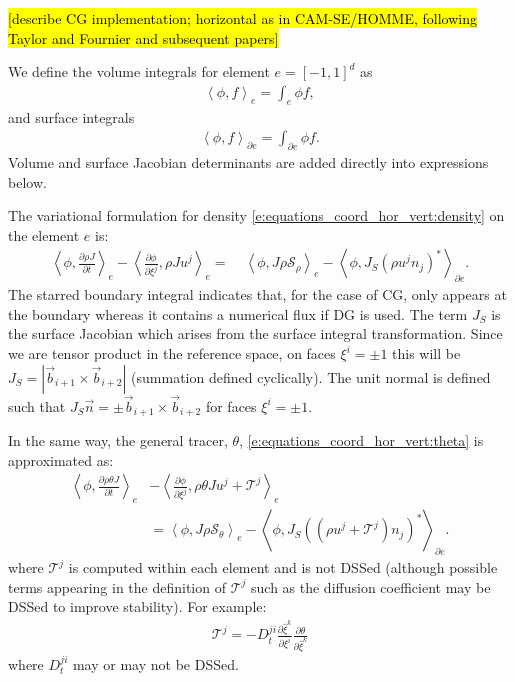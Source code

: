 \documentclass{report}
\newcommand{\inner}[2]{ \left\langle #1, #2 \right\rangle }
\begin{document}
\hl{[describe CG implementation; horizontal as in CAM-SE/HOMME, following Taylor and Fournier and subsequent papers]}

We define the volume integrals for element $e = {[-1, 1]}^{d}$ as
\begin{align}
    \inner{\phi}{f}_{e} = \int_{e} \phi f,
\end{align}
and surface integrals
\begin{align}
    \inner{\phi}{f}_{\partial e} = \int_{\partial e} \phi f.
\end{align}
Volume and surface Jacobian determinants are added directly into expressions below.

The variational formulation for density \eqref{e:equations_coord_hor_vert:density} on the element $e$ is:
\begin{align}
   \inner{\phi}{\frac{\partial \rho J}{\partial t}}_{e}
   -
   \inner{\frac{\partial \phi}{\partial \xi^j}}
   {\rho J u^j}_{e}
    =&\; \inner{\phi}{J\rho \mathcal{S}_\rho}_{e} 
    - \inner{\phi}{J_{S} {\left(\rho u^j n_j\right)}^*}_{\partial e}.
\end{align}
The starred boundary integral indicates that, for the case of CG, only appears at the boundary whereas it contains a numerical flux if DG is used.
The term $J_{S}$ is the surface Jacobian which arises from the surface integral transformation.
Since we are tensor product in the reference space, on faces $\xi^{i}=\pm 1$ this will be
$J_{S} = |\vec{b}_{i+1} \times \vec{b}_{i+2}|$ (summation defined cyclically).
The unit normal is defined such that $J_{S} \vec{n} = \pm \vec{b}_{i+1} \times \vec{b}_{i+2}$
for faces $\xi^{i} = \pm 1$.

In the same way, the general tracer, $\theta$, \eqref{e:equations_coord_hor_vert:theta} is approximated as:
\begin{align}
   \inner{\phi}{\frac{\partial \rho \theta J}{\partial t}}_{e}&
   -
   \inner{\frac{\partial \phi}{\partial \xi^j}}
   {\rho \theta J u^j + \mathcal{T}^{j}}_{e}\nonumber\\
    &= \inner{\phi}{J\rho \mathcal{S}_\theta}_{e}
    - \inner{\phi}{J_{S}{\left(\left(\rho u^j + \mathcal{T}^{j}\right)n_{j}\right)}^*}_{\partial e}.
\end{align}
where $\mathcal{T}^j$ is computed within each element and is not DSSed (although possible terms appearing in the definition of $\mathcal{T}^j$ such as the diffusion coefficient may be DSSed to improve stability). For example:
\begin{align}
    \mathcal{T}^j = -D_t^{ji}\frac{\partial \hat{\xi}^k}{\partial \xi^i}\frac{\partial \theta}{\partial \hat{\xi}^k}
\end{align}
where $D_t^{ji}$ may or may not be DSSed.
\end{document}
